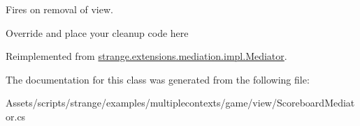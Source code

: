 Fires on removal of view. 

Override and place your cleanup code here 

Reimplemented from \hyperlink{classstrange_1_1extensions_1_1mediation_1_1impl_1_1_mediator_a9c65534ae8c37db9f4db7c84a94cd635}{strange.\-extensions.\-mediation.\-impl.\-Mediator}.



The documentation for this class was generated from the following file\-:\begin{DoxyCompactItemize}
\item 
Assets/scripts/strange/examples/multiplecontexts/game/view/Scoreboard\-Mediator.\-cs\end{DoxyCompactItemize}
